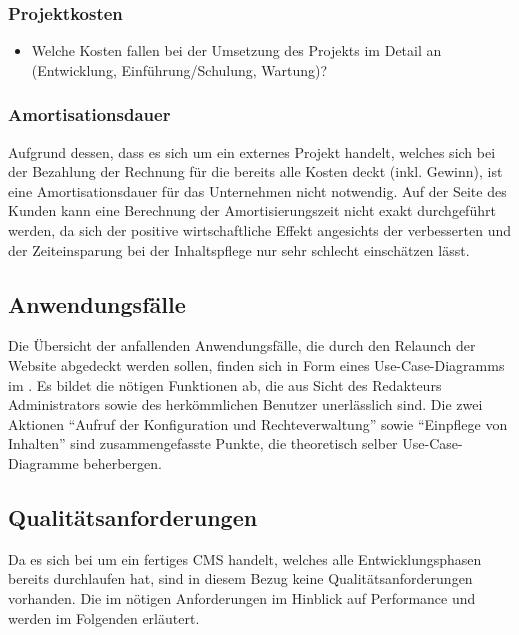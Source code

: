 \subsubsection{Projektkosten}
\label{sec:Projektkosten}
\begin{itemize}
	\item Welche Kosten fallen bei der Umsetzung des Projekts im Detail an (\zB Entwicklung, Einführung/Schulung, Wartung)?
\end{itemize}




\subsubsection{Amortisationsdauer}
\label{sec:Amortisationsdauer}

Aufgrund dessen, dass es sich um ein externes Projekt handelt, welches sich bei
der Bezahlung der Rechnung für die \mh bereits alle Kosten deckt (inkl. Gewinn), ist
eine Amortisationsdauer für das Unternehmen nicht notwendig.
Auf der Seite des Kunden kann eine Berechnung der Amortisierungszeit nicht exakt
durchgeführt werden, da sich der positive wirtschaftliche Effekt angesichts der
verbesserten  und der Zeiteinsparung bei der
Inhaltspflege nur sehr schlecht einschätzen lässt.


\subsection{Anwendungsfälle}
\label{sec:Anwendungsfaelle}

Die Übersicht der anfallenden Anwendungsfälle, die durch den Relaunch der
Website abgedeckt werden sollen, finden sich in Form eines Use-Case-Diagramms
im . Es bildet die nötigen Funktionen ab, die aus Sicht
des Redakteurs \bzw Administrators sowie des herkömmlichen Benutzer unerlässlich
sind. Die zwei Aktionen "`Aufruf der Konfiguration und Rechteverwaltung"' sowie
"`Einpflege von Inhalten"' sind zusammengefasste Punkte, die theoretisch selber
Use-Case-Diagramme beherbergen.

\subsection{Qualitätsanforderungen}
\label{sec:Qualitaetsanforderungen}

Da es sich bei \ct um ein fertiges \ac{CMS} handelt, welches alle
Entwicklungsphasen bereits durchlaufen hat, sind in diesem Bezug keine
Qualitätsanforderungen vorhanden. Die im  nötigen
Anforderungen im Hinblick auf Performance und  werden im
Folgenden erläutert.

